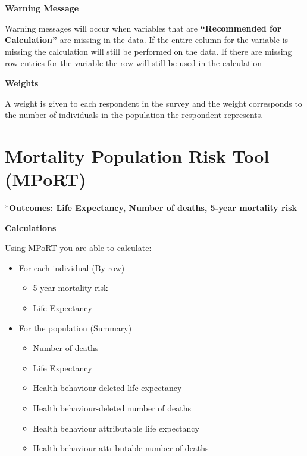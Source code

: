 \documentclass[]{book}
\providecommand{\tightlist}{%
  \setlength{\itemsep}{0pt}\setlength{\parskip}{0pt}}
\begin{document}
\textbf{Warning Message}

Warning messages will occur when variables that are \textbf{``Recommended for Calculation''} are missing in the data. If the entire column for the variable is missing the calculation will still be performed on the data. If there are missing row entries for the variable the row will still be used in the calculation

\textbf{Weights}

A weight is given to each respondent in the survey and the weight corresponds to the number of individuals in the population the respondent represents.

















\hypertarget{appendix-appendix}{%
\appendix}


\hypertarget{mport}{%
\chapter{Mortality Population Risk Tool (MPoRT)}\label{mport}}

*\textbf{Outcomes: Life Expectancy, Number of deaths, 5-year mortality risk}

\textbf{Calculations}

Using MPoRT you are able to calculate:

\begin{itemize}
\item
  For each individual (By row)

  \begin{itemize}
  \tightlist
  \item
    5 year mortality risk
  \item
    Life Expectancy
  \end{itemize}
\item
  For the population (Summary)

  \begin{itemize}
  \tightlist
  \item
    Number of deaths
  \item
    Life Expectancy
  \item
    Health behaviour-deleted life expectancy
  \item
    Health behaviour-deleted number of deaths
  \item
    Health behaviour attributable life expectancy
  \item
    Health behaviour attributable number of deaths
  \end{itemize}
\end{itemize}
\end{document}
